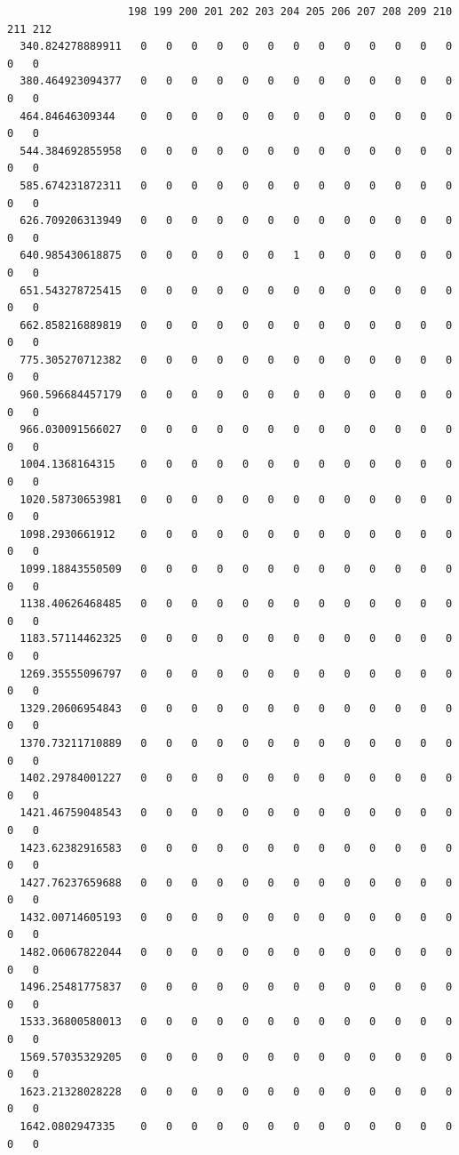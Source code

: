 \documentclass[
  letterpaper,
  DIV=11,
  numbers=noendperiod]{scrartcl}
\begin{document}
\begin{verbatim}
                   198 199 200 201 202 203 204 205 206 207 208 209 210 211 212
  340.824278889911   0   0   0   0   0   0   0   0   0   0   0   0   0   0   0
  380.464923094377   0   0   0   0   0   0   0   0   0   0   0   0   0   0   0
  464.84646309344    0   0   0   0   0   0   0   0   0   0   0   0   0   0   0
  544.384692855958   0   0   0   0   0   0   0   0   0   0   0   0   0   0   0
  585.674231872311   0   0   0   0   0   0   0   0   0   0   0   0   0   0   0
  626.709206313949   0   0   0   0   0   0   0   0   0   0   0   0   0   0   0
  640.985430618875   0   0   0   0   0   0   1   0   0   0   0   0   0   0   0
  651.543278725415   0   0   0   0   0   0   0   0   0   0   0   0   0   0   0
  662.858216889819   0   0   0   0   0   0   0   0   0   0   0   0   0   0   0
  775.305270712382   0   0   0   0   0   0   0   0   0   0   0   0   0   0   0
  960.596684457179   0   0   0   0   0   0   0   0   0   0   0   0   0   0   0
  966.030091566027   0   0   0   0   0   0   0   0   0   0   0   0   0   0   0
  1004.1368164315    0   0   0   0   0   0   0   0   0   0   0   0   0   0   0
  1020.58730653981   0   0   0   0   0   0   0   0   0   0   0   0   0   0   0
  1098.2930661912    0   0   0   0   0   0   0   0   0   0   0   0   0   0   0
  1099.18843550509   0   0   0   0   0   0   0   0   0   0   0   0   0   0   0
  1138.40626468485   0   0   0   0   0   0   0   0   0   0   0   0   0   0   0
  1183.57114462325   0   0   0   0   0   0   0   0   0   0   0   0   0   0   0
  1269.35555096797   0   0   0   0   0   0   0   0   0   0   0   0   0   0   0
  1329.20606954843   0   0   0   0   0   0   0   0   0   0   0   0   0   0   0
  1370.73211710889   0   0   0   0   0   0   0   0   0   0   0   0   0   0   0
  1402.29784001227   0   0   0   0   0   0   0   0   0   0   0   0   0   0   0
  1421.46759048543   0   0   0   0   0   0   0   0   0   0   0   0   0   0   0
  1423.62382916583   0   0   0   0   0   0   0   0   0   0   0   0   0   0   0
  1427.76237659688   0   0   0   0   0   0   0   0   0   0   0   0   0   0   0
  1432.00714605193   0   0   0   0   0   0   0   0   0   0   0   0   0   0   0
  1482.06067822044   0   0   0   0   0   0   0   0   0   0   0   0   0   0   0
  1496.25481775837   0   0   0   0   0   0   0   0   0   0   0   0   0   0   0
  1533.36800580013   0   0   0   0   0   0   0   0   0   0   0   0   0   0   0
  1569.57035329205   0   0   0   0   0   0   0   0   0   0   0   0   0   0   0
  1623.21328028228   0   0   0   0   0   0   0   0   0   0   0   0   0   0   0
  1642.0802947335    0   0   0   0   0   0   0   0   0   0   0   0   0   0   0

\end{verbatim}
\end{document}

